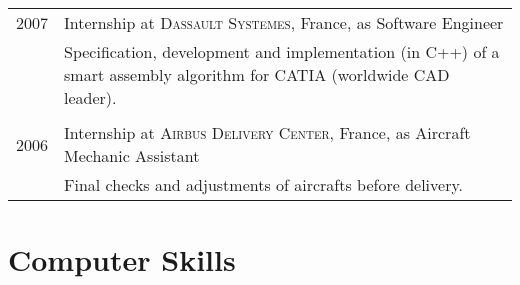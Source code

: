 \documentclass[a4paper,10pt]{article} %
\begin{document}
\begin{tabular}{r|p{11cm}}

\textsc{2007} &
Internship at \textsc{Dassault Systemes}, France, as Software Engineer \\
& \footnotesize{Specification, development and implementation (in C++) of a
  smart assembly algorithm for CATIA (worldwide CAD leader).} \\
\multicolumn{2}{c}{} \\


\textsc{2006} &
Internship at \textsc{Airbus Delivery Center}, France,
 as Aircraft Mechanic Assistant \\
& \footnotesize{Final checks and adjustments of aircrafts before delivery.} \\




\end{tabular}


\section{Computer Skills}
\end{document}
